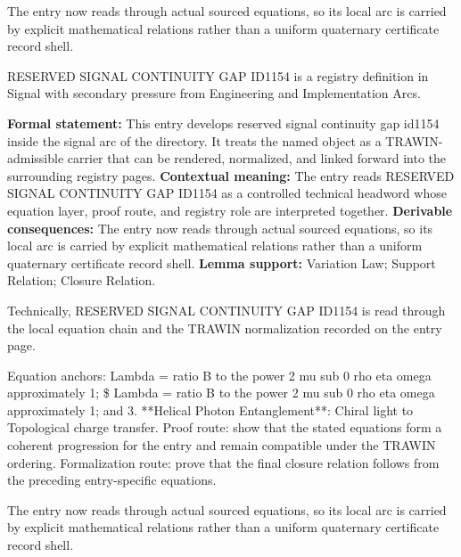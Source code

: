 The entry now reads through actual sourced equations, so its local arc is carried by explicit mathematical relations rather than a uniform quaternary certificate record shell.
\clearpage


\begingroup\small
{}
RESERVED SIGNAL CONTINUITY GAP ID1154 is a registry definition in Signal with secondary pressure from Engineering and Implementation Arcs.

\begingroup\footnotesize\setlength{\emergencystretch}{3em}\sloppy
\textbf{Formal statement:} This entry develops reserved signal continuity gap id1154 inside the signal arc of the directory. It treats the named object as a TRAWIN-admissible carrier that can be rendered, normalized, and linked forward into the surrounding registry pages. \textbf{Contextual meaning:} The entry reads RESERVED SIGNAL CONTINUITY GAP ID1154 as a controlled technical headword whose equation layer, proof route, and registry role are interpreted together. \textbf{Derivable consequences:} The entry now reads through actual sourced equations, so its local arc is carried by explicit mathematical relations rather than a uniform quaternary certificate record shell. \textbf{Lemma support:} Variation Law; Support Relation; Closure Relation.\par
\endgroup

Technically, RESERVED SIGNAL CONTINUITY GAP ID1154 is read through the local equation chain and the TRAWIN normalization recorded on the entry page.

Equation anchors: Lambda = ratio B to the power 2 mu sub 0 rho eta omega approximately 1; \$ Lambda = ratio B to the power 2 mu sub 0 rho eta omega approximately 1; and 3. **Helical Photon Entanglement**: Chiral light to Topological charge transfer. Proof route: show that the stated equations form a coherent progression for the entry and remain compatible under the TRAWIN ordering. Formalization route: prove that the final closure relation follows from the preceding entry-specific equations.

The entry now reads through actual sourced equations, so its local arc is carried by explicit mathematical relations rather than a uniform quaternary certificate record shell.
\endgroup

